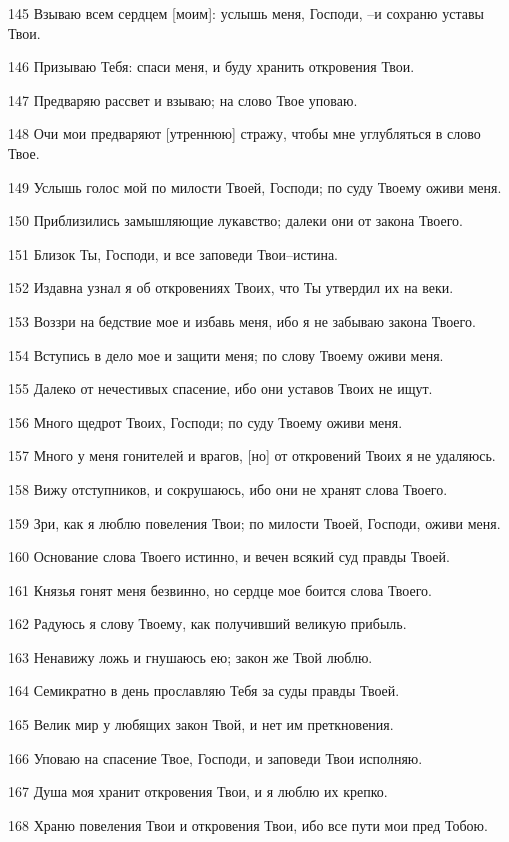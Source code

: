 \par 145 Взываю всем сердцем [моим]: услышь меня, Господи, --и сохраню уставы Твои.
\par 146 Призываю Тебя: спаси меня, и буду хранить откровения Твои.
\par 147 Предваряю рассвет и взываю; на слово Твое уповаю.
\par 148 Очи мои предваряют [утреннюю] стражу, чтобы мне углубляться в слово Твое.
\par 149 Услышь голос мой по милости Твоей, Господи; по суду Твоему оживи меня.
\par 150 Приблизились замышляющие лукавство; далеки они от закона Твоего.
\par 151 Близок Ты, Господи, и все заповеди Твои--истина.
\par 152 Издавна узнал я об откровениях Твоих, что Ты утвердил их на веки.
\par 153 Воззри на бедствие мое и избавь меня, ибо я не забываю закона Твоего.
\par 154 Вступись в дело мое и защити меня; по слову Твоему оживи меня.
\par 155 Далеко от нечестивых спасение, ибо они уставов Твоих не ищут.
\par 156 Много щедрот Твоих, Господи; по суду Твоему оживи меня.
\par 157 Много у меня гонителей и врагов, [но] от откровений Твоих я не удаляюсь.
\par 158 Вижу отступников, и сокрушаюсь, ибо они не хранят слова Твоего.
\par 159 Зри, как я люблю повеления Твои; по милости Твоей, Господи, оживи меня.
\par 160 Основание слова Твоего истинно, и вечен всякий суд правды Твоей.
\par 161 Князья гонят меня безвинно, но сердце мое боится слова Твоего.
\par 162 Радуюсь я слову Твоему, как получивший великую прибыль.
\par 163 Ненавижу ложь и гнушаюсь ею; закон же Твой люблю.
\par 164 Семикратно в день прославляю Тебя за суды правды Твоей.
\par 165 Велик мир у любящих закон Твой, и нет им преткновения.
\par 166 Уповаю на спасение Твое, Господи, и заповеди Твои исполняю.
\par 167 Душа моя хранит откровения Твои, и я люблю их крепко.
\par 168 Храню повеления Твои и откровения Твои, ибо все пути мои пред Тобою.
